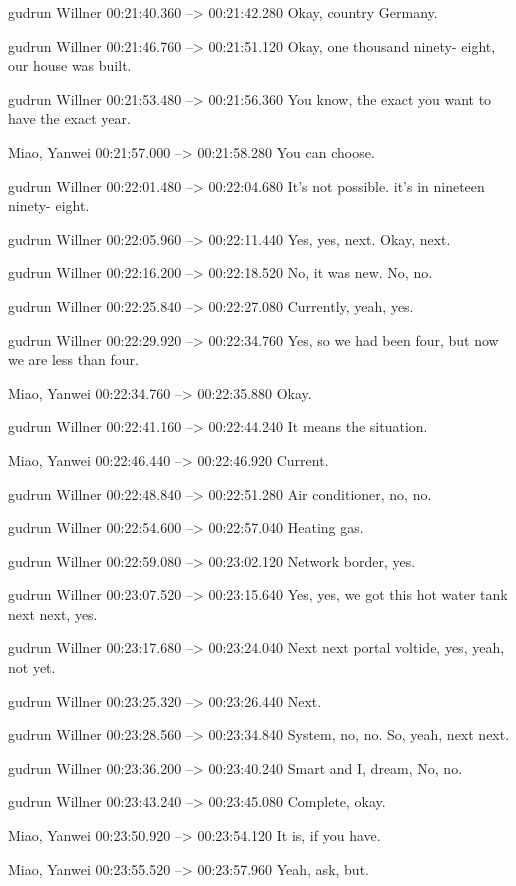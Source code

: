 {gudrun Willner 00:21:40.360 --> 00:21:42.280
Okay, country Germany.

gudrun Willner 00:21:46.760 --> 00:21:51.120
Okay, one thousand ninety- eight, our house was built.

gudrun Willner 00:21:53.480 --> 00:21:56.360
You know, the exact you want to have the exact year.

Miao, Yanwei 00:21:57.000 --> 00:21:58.280
You can choose.

gudrun Willner 00:22:01.480 --> 00:22:04.680
It's not possible. it's in nineteen ninety- eight.

gudrun Willner 00:22:05.960 --> 00:22:11.440
Yes, yes, next. Okay, next.

gudrun Willner 00:22:16.200 --> 00:22:18.520
No, it was new. No, no.

gudrun Willner 00:22:25.840 --> 00:22:27.080
Currently, yeah, yes.

gudrun Willner 00:22:29.920 --> 00:22:34.760
Yes, so we had been four, but now we are less than four.

Miao, Yanwei 00:22:34.760 --> 00:22:35.880
Okay.

gudrun Willner 00:22:41.160 --> 00:22:44.240
It means the situation.

Miao, Yanwei 00:22:46.440 --> 00:22:46.920
Current.

gudrun Willner 00:22:48.840 --> 00:22:51.280
Air conditioner, no, no.

gudrun Willner 00:22:54.600 --> 00:22:57.040
Heating gas.

gudrun Willner 00:22:59.080 --> 00:23:02.120
Network border, yes.

gudrun Willner 00:23:07.520 --> 00:23:15.640
Yes, yes, we got this hot water tank next next, yes.

gudrun Willner 00:23:17.680 --> 00:23:24.040
Next next portal voltide, yes, yeah, not yet.

gudrun Willner 00:23:25.320 --> 00:23:26.440
Next.

gudrun Willner 00:23:28.560 --> 00:23:34.840
System, no, no. So, yeah, next next.

gudrun Willner 00:23:36.200 --> 00:23:40.240
Smart and I, dream, No, no.

gudrun Willner 00:23:43.240 --> 00:23:45.080
Complete, okay.

Miao, Yanwei 00:23:50.920 --> 00:23:54.120
It is, if you have.

Miao, Yanwei 00:23:55.520 --> 00:23:57.960
Yeah, ask, but.

}
